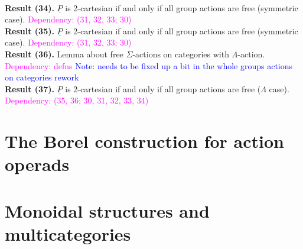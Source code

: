 \documentclass{amsart}
\begin{document}
\\ \textbf{Result (34).} $\underline{P}$ is 2-cartesian if and only if all group actions are free (symmetric case). \textcolor{magenta}{Dependency: (31, 32, 33; 30)} 
\\ \textbf{Result (35).} $\underline{P}$ is 2-cartesian if and only if all group actions are free (symmetric case). \textcolor{magenta}{Dependency: (31, 32, 33; 30)} 
\\ \textbf{Result (36).} Lemma about free $\Sigma$-actions on categories with $\Lambda$-action. \textcolor{magenta}{Dependency: defns} \textcolor{blue}{Note: needs to be fixed up a bit in the whole groups actions on categories rework}
\\ \textbf{Result (37).} $\underline{P}$ is 2-cartesian if and only if all group actions are free ($\Lambda$ case). \textcolor{magenta}{Dependency: (35, 36; 30, 31, 32, 33, 34)} 


\section{The Borel construction for action operads}

\section{Monoidal structures and multicategories}
\end{document}
